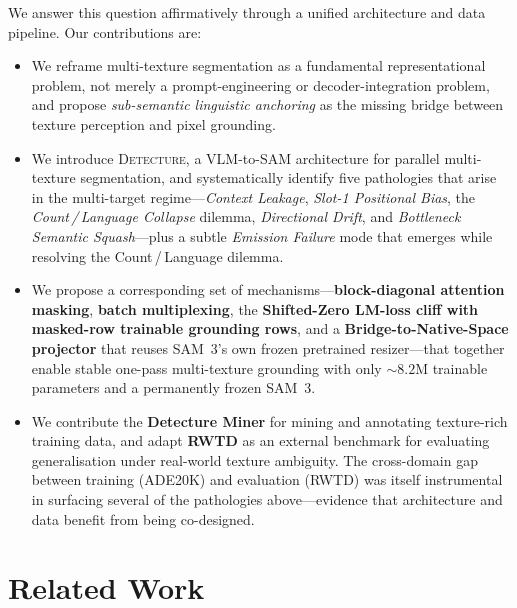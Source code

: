 \documentclass{article}
\begin{document}
We answer this question affirmatively through a unified architecture and data pipeline. Our contributions are:

\begin{itemize}
    \item We reframe multi-texture segmentation as a fundamental representational problem, not merely a prompt-engineering or decoder-integration problem, and propose \emph{sub-semantic linguistic anchoring} as the missing bridge between texture perception and pixel grounding.

    \item We introduce \textsc{Detecture}, a VLM-to-SAM architecture for parallel multi-texture segmentation, and systematically identify five pathologies that arise in the multi-target regime---\emph{Context Leakage}, \emph{Slot-1 Positional Bias}, the \emph{Count\,/\,Language Collapse} dilemma, \emph{Directional Drift}, and \emph{Bottleneck Semantic Squash}---plus a subtle \emph{Emission Failure} mode that emerges while resolving the Count\,/\,Language dilemma.

    \item We propose a corresponding set of mechanisms---\textbf{block-diagonal attention masking}, \textbf{batch multiplexing}, the \textbf{Shifted-Zero LM-loss cliff with masked-row trainable grounding rows}, and a \textbf{Bridge-to-Native-Space projector} that reuses SAM~3's own frozen pretrained resizer---that together enable stable one-pass multi-texture grounding with only ${\sim}8.2$M trainable parameters and a permanently frozen SAM~3.

    \item We contribute the \textbf{Detecture Miner} for mining and annotating texture-rich training data, and adapt \textbf{RWTD} as an external benchmark for evaluating generalisation under real-world texture ambiguity. The cross-domain gap between training (ADE20K) and evaluation (RWTD) was itself instrumental in surfacing several of the pathologies above---evidence that architecture and data benefit from being co-designed.
\end{itemize}

\section{Related Work}
\end{document}
